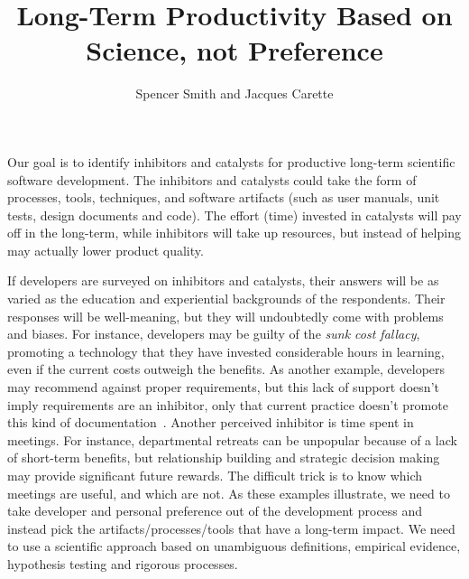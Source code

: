 \documentclass[sigconf, authorversion, nonacm]{acmart}
\begin{document}
\title{Long-Term Productivity Based on Science, not Preference}

\author{Spencer Smith and Jacques Carette}


\maketitle

Our goal is to identify inhibitors and catalysts for productive long-term
scientific software development.  The inhibitors and catalysts could take the
form of processes, tools, techniques, and software artifacts (such as user
manuals, unit tests, design documents and code). The effort (time) invested in
catalysts will pay off in the long-term, while inhibitors will take up
resources, but instead of helping may actually lower product quality.

If developers are surveyed on inhibitors and catalysts, their answers will be as
varied as the education and experiential backgrounds of the respondents. Their
responses will be well-meaning, but they will undoubtedly come with problems and
biases.  For instance, developers may be guilty of the \emph{sunk cost fallacy},
promoting a technology that they have invested considerable hours in learning,
even if the current costs outweigh the benefits. As another example, developers
may recommend against proper requirements, but this lack of support doesn't
imply requirements are an inhibitor, only that current practice doesn't promote
this kind of documentation~\cite{HeatonAndCarver2015}. Another perceived
inhibitor is time spent in meetings. For instance, departmental retreats can be
unpopular because of a lack of short-term benefits, but relationship building
and strategic decision making may provide significant future rewards. The
difficult trick is to know which meetings are useful, and which are not.  As
these examples illustrate, we need to take developer and personal preference out
of the development process and instead pick the artifacts/processes/tools that
have a long-term impact.  We need to use a scientific approach based on
unambiguous definitions, empirical evidence, hypothesis testing and rigorous
processes.
\end{document}
